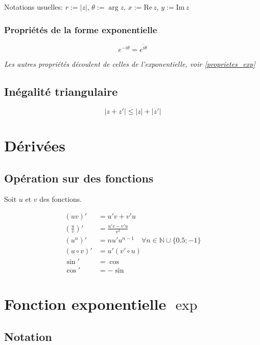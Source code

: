 \documentclass{article}
\newcommand{\im}{\text{Im}\,}
\newcommand{\re}{\text{Re}\,}
\newcommand{\N}{\mathds{N}}
\newcommand{\conj}[1]{\overline{#1}}
\begin{document}
Notations usuelles: $r := |z|$, $\theta := \arg z$, $x := \re z$, $y := \im z$

\subsubsection{Propriétés de la forme exponentielle}

\[e^{-i\theta} = \conj{e^{i\theta}}\]

\textit{Les autres propriétés découlent de celles de l'exponentielle, voir \ref{proprietes_exp}}

\subsection{Inégalité triangulaire}

\[| z + z' | \leq |z| + |z'|\]

\newpage\section{Dérivées}

\subsection{Opération sur des fonctions}

Soit $u$ et $v$ des fonctions.

\begin{equation*}
    \begin{split}
        (uv)' &= u'v+v'u\\
        \left(\frac{u}{v}\right)' &= \frac{u'v-v'u}{v^2}\\
        (u^n)' &= nu'u^{n-1}\quad\forall n\in\N\cup\{0.5; -1\}\\
        (u \circ v)' &= u'(v' \circ u)\\
        \sin' &= \cos \\
        \cos' &= -\sin
    \end{split}
\end{equation*}

\newpage\section{Fonction exponentielle $\exp$}

\subsection{Notation}
\end{document}
